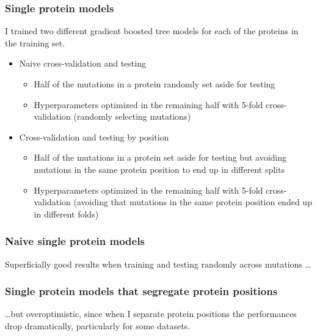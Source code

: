 \documentclass[10pt, british]{beamer}
\begin{document}
\begin{frame}
	\frametitle{Single protein models}
	I trained two different gradient boosted tree models for each of the proteins in the training set.
	\begin{itemize}
		\item Naive cross-validation and testing
		      \begin{itemize}
			      \item Half of the mutations in a protein randomly set aside for testing
			      \item Hyperparameters optimized in the remaining half with 5-fold cross-validation (randomly selecting mutations)
		      \end{itemize}
		\item Cross-validation and testing by position
		      \begin{itemize}
			      \item Half of the mutations in a protein set aside for testing but avoiding mutations in the same protein position to end up in different splits
			      \item Hyperparameters optimized in the remaining half with 5-fold cross-validation (avoiding that mutations in the same protein position ended up in different folds)
		      \end{itemize}
	\end{itemize}
\end{frame}

\begin{frame}
	\frametitle{Naive single protein models}
	Superficially good results when training and testing randomly across mutations \ldots%
	\vfill%
	\centering%
	
\end{frame}

\begin{frame}
	\frametitle{Single protein models that segregate protein positions}
	\ldots but overoptimistic, since when I separate protein positions the performances drop dramatically, particularly for some datasets.
	\vfill%
	\centering%
	
\end{frame}
\end{document}
